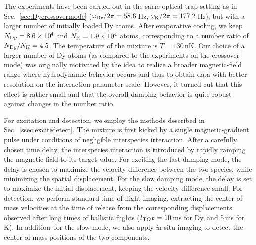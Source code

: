 The experiments have been carried out in the same optical trap setting as in Sec.~\ref{sec:Dycrossovermode} ($\omega_{\textrm Dy}/2\pi = 58.6$\,Hz, $\omega_{\textrm K}/2\pi = 177.2$\,Hz), but with a larger number of initially loaded Dy atoms. After evaporative cooling, we keep
$N_{\textrm Dy} = 8.6 \times 10^4$ and $N_{\textrm K} = 1.9 \times 10^4$ atoms, corresponding to a number ratio of $N_{\textrm Dy}/N_{\textrm K}=4.5$. The temperature of the mixture is $T = 130$\,nK. {Our choice of a larger number of Dy atoms (as compared to the experiments on the crossover mode) was originally motivated by the idea to realize a broader magnetic-field range where hydrodynamic behavior occurs and thus to obtain data with better resolution on the interaction parameter scale. However, it turned out that this effect is rather small and that the overall damping behavior is quite robust against changes in the number ratio.}

For excitation and detection, we employ the methods described in Sec.~\ref{ssec:excitedetect}. The mixture is first kicked by a single magnetic-gradient pulse under conditions of negligible interspecies interaction. 
After a carefully chosen time delay, the interspecies interaction is introduced by rapidly ramping the magnetic field to its target value. For exciting the fast damping mode, the delay is chosen to maximize the velocity difference between the two species, while minimizing the spatial displacement. For the slow damping mode, the delay is set to maximize the initial displacement, keeping the velocity difference small.
For detection, we perform standard time-of-flight imaging, {extracting the center-of-mass velocities at the time of release from the corresponding displacements observed after long times of ballistic flights ($t_{\textrm TOF} = 10$\,ms for Dy, and 5\,ms for K).}
In addition, for the slow mode, {we also apply} {\textit in-situ} imaging to detect the center-of-mass positions of the two components.

